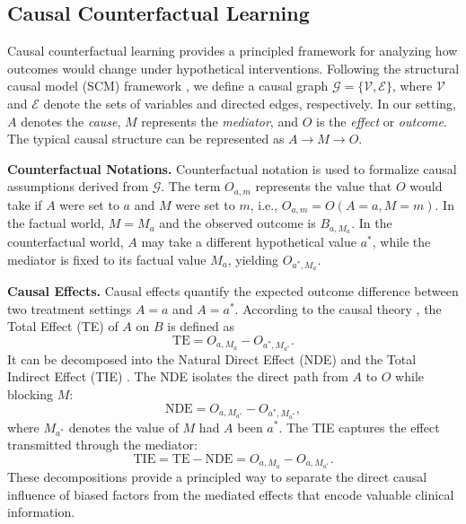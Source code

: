 \subsection{Causal Counterfactual Learning}

Causal counterfactual learning provides a principled framework for analyzing how outcomes would change under hypothetical interventions. 
Following the structural causal model (SCM) framework \cite{pearl2009causality}, 
we define a causal graph $\mathcal{G}=\{\mathcal{V}, \mathcal{E}\}$, where $\mathcal{V}$ and $\mathcal{E}$ denote the sets of variables and directed edges, respectively. 
In our setting, $A$ denotes the \textit{cause}, 
$M$ represents the \textit{mediator}, 
and $O$ is the \textit{effect} or \textit{outcome}.
The typical causal structure can be represented as $A \!\to\! M \!\to\! O$.  

\noindent\textbf{Counterfactual Notations.} Counterfactual notation is used to formalize causal assumptions derived from $\mathcal{G}$. The term $O_{a,m}$ represents the value that $O$ would take if $A$ were set to $a$ and $M$ were set to $m$, i.e., $O_{a,m} = O(A{=}a, M{=}m)$. 
In the factual world, $M=M_a$ and the observed outcome is $B_{a,M_a}$. In the counterfactual world, $A$ may take a different hypothetical value $a^*$, while the mediator is fixed to its factual value $M_a$, yielding $O_{a^*,M_a}$. 

\noindent\textbf{Causal Effects.} Causal effects quantify the expected outcome difference between two treatment settings $A=a$ and $A=a^*$. According to the causal theory \cite{pearl2014interpretation}, the Total Effect (TE) of $A$ on $B$ is defined as
\begin{equation}
\text{TE} = O_{a,M_a} - O_{a^*,M_{a^*}}.
\end{equation}
It can be decomposed into the Natural Direct Effect (NDE) and the Total Indirect Effect (TIE) \cite{pearl2016causal}. 
The NDE isolates the direct path from $A$ to $O$ while blocking $M$:
\begin{equation}
\text{NDE} = O_{a,M_{a^*}} - O_{a^*,M_{a^*}},
\end{equation}
where $M_{a^*}$ denotes the value of $M$ had $A$ been $a^*$. 
The TIE captures the effect transmitted through the mediator:
\begin{equation}
\text{TIE} = \text{TE} - \text{NDE} = O_{a,M_a} - O_{a,M_{a^*}}.
\end{equation}
These decompositions provide a principled way to separate the direct causal influence of biased factors from the mediated effects that encode valuable clinical information.

\fi